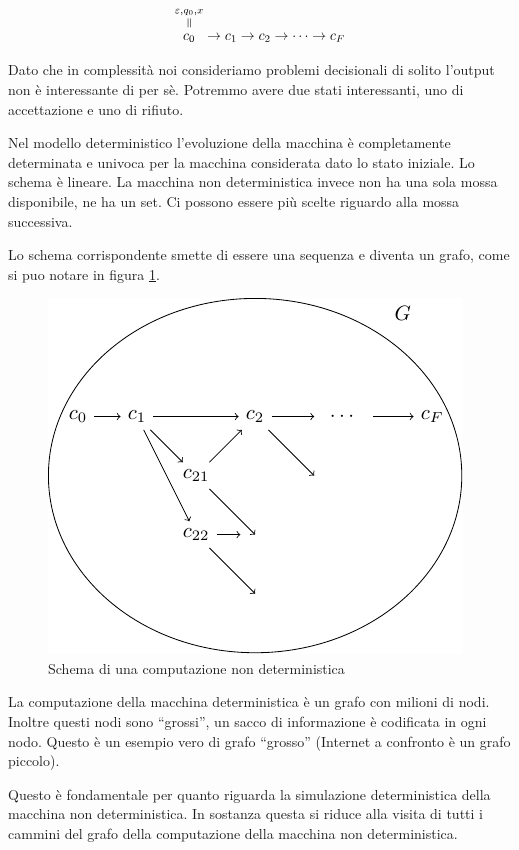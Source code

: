 \begin{equation*}
    \overequalto{c_{0}}{\varepsilon,q_{0},x} \to c_{1} \to c_{2} \to \cdots \to c_{F}
\end{equation*}

Dato che in complessità noi consideriamo problemi decisionali di solito l'output non è
interessante di per sè. Potremmo avere due stati interessanti, uno di accettazione e uno di
rifiuto.

Nel modello deterministico l'evoluzione della macchina è completamente determinata e univoca per la
macchina considerata dato lo stato iniziale. Lo schema è lineare. La macchina non deterministica
invece non ha una sola mossa disponibile, ne ha un set. Ci possono essere più scelte riguardo alla
mossa successiva.

Lo schema corrispondente smette di essere una sequenza e diventa un grafo, come si puo notare in
figura \ref{img:nondetcomp}.

\begin{figure}[h]
    \begin{center}
        \includegraphics{img/NonDetComputation.pdf}
        \caption{Schema di una computazione non deterministica}
        \label{img:nondetcomp}
    \end{center}
\end{figure}

La computazione della macchina deterministica è un grafo con milioni di nodi. Inoltre questi nodi
sono ``grossi'', un sacco di informazione è codificata in ogni nodo. Questo è un esempio vero di
grafo ``grosso'' (Internet a confronto è un grafo piccolo).

Questo è fondamentale per quanto riguarda la simulazione deterministica della macchina non
deterministica. In sostanza questa si riduce alla visita di tutti i cammini del grafo della
computazione della macchina non deterministica.

